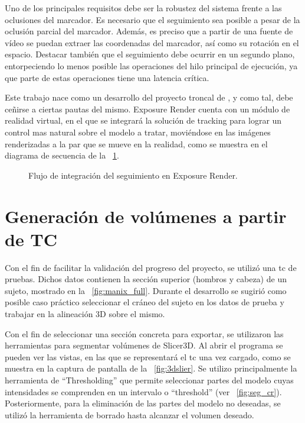 Uno de los principales requisitos debe ser la robustez del sistema frente a las oclusiones del marcador. Es necesario que el seguimiento sea posible a pesar de la oclusión parcial del marcador. Además, es preciso que a partir de una fuente de vídeo se puedan extraer las coordenadas del marcador, así como su rotación en el espacio. Destacar también que el seguimiento debe ocurrir en un segundo plano, entorpeciendo lo menos posible las operaciones del hilo principal de ejecución, ya que parte de estas operaciones tiene una latencia crítica.

Este trabajo nace como un desarrollo del proyecto troncal de \citeauthor{IglesiasGuitian2022}, y como tal, debe ceñirse a ciertas pautas del mismo. Exposure Render cuenta con un módulo de realidad virtual, en el que se integrará la solución de tracking para lograr un control mas natural sobre el modelo a tratar, moviéndose en las imágenes renderizadas a la par que se mueve en la realidad, como se muestra en el diagrama de secuencia de la \figurename~\ref{fig:flow_exposure}.

\begin{figure}
  \centering
  
  \caption{Flujo de integración del seguimiento en Exposure Render.}
  \label{fig:flow_exposure}
\end{figure}

\section{Generación de volúmenes a partir de TC}
Con el fin de facilitar la validación del progreso del proyecto, se utilizó una \acrshort{tc} de pruebas. Dichos datos contienen la sección superior (hombros y cabeza) de un sujeto, mostrado en la \figurename~\ref{fig:manix_full}. Durante el desarrollo se sugirió como posible caso práctico seleccionar el cráneo del sujeto en los datos de prueba y trabajar en la alineación 3D sobre el mismo.


Con el fin de seleccionar una sección concreta para exportar, se utilizaron las herramientas para segmentar volúmenes de Slicer3D.
Al abrir el programa se pueden ver las vistas, en las que se representará el \acrshort{tc} una vez cargado, como se muestra en la captura de pantalla de la \figurename~\ref{fig:3dslier}.
Se utilizo principalmente la herramienta de ``Thresholding'' que permite seleccionar partes del modelo cuyas intensidades se comprenden en un intervalo o ``threshold'' (ver \figurename~\ref{fig:seg_cr}). Posteriormente, para la eliminación de las partes del modelo no deseadas, se utilizó la herramienta de borrado hasta alcanzar el volumen deseado.

